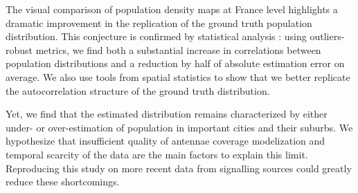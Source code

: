 The visual comparison of population density maps at France level highlights a dramatic improvement in the replication of the ground truth population distribution. This conjecture is confirmed by statistical analysis : using outliers-robust metrics, we find both a substantial increase in correlations between population distributions and a reduction by half of absolute estimation error on average.  We also use tools from spatial statistics to show that we better replicate the autocorrelation structure of the ground truth distribution.

Yet, we find that the estimated distribution remains characterized by either under- or over-estimation of population in important cities and their suburbs. We hypothesize that insufficient quality of antennae coverage modelization and temporal scarcity of the data are the main factors to explain this limit. Reproducing this study on more recent data from signalling sources could greatly reduce these shortcomings.
